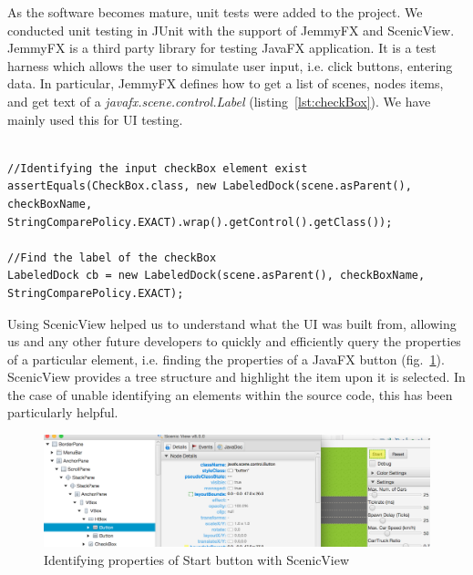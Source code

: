 As the software becomes mature, unit tests were added to the project. We conducted unit testing in JUnit with the support of JemmyFX and ScenicView. JemmyFX is a third party library for testing JavaFX application. It is a test harness which allows the user to simulate user input, i.e. click buttons, entering data. In particular, JemmyFX defines how to get a list of scenes, nodes items, and get text of a \textit{javafx.scene.control.Label} (listing~\ref{lst:checkBox}). We have mainly used this for UI testing. 


\begin{minipage}{0.9\textwidth}
	\begin{lstlisting}[caption={Use JemmyFX syntax to find a checkBox element}, label={lst:checkBox}]

//Identifying the input checkBox element exist
assertEquals(CheckBox.class, new LabeledDock(scene.asParent(), checkBoxName, StringComparePolicy.EXACT).wrap().getControl().getClass());

//Find the label of the checkBox 
LabeledDock cb = new LabeledDock(scene.asParent(), checkBoxName, StringComparePolicy.EXACT);

	\end{lstlisting}
\end{minipage}

Using ScenicView helped us to understand what the UI was built from, allowing us and any other future developers to quickly and efficiently query the properties of a particular element, i.e. finding the properties of a JavaFX button (fig.~\ref{fig:scenicview}). ScenicView provides a tree structure and highlight the item upon it is selected. In the case of unable identifying an elements within the source code, this has been particularly helpful.  
\begin{figure}[h]
	\begin{center}
		\includegraphics[width=\textwidth]{img/scenicView.png}
		\caption[Identifying properties of Start button with ScenicView]{Identifying properties of Start button with ScenicView}
		\label{fig:scenicview}
	\end{center}
\end{figure}

